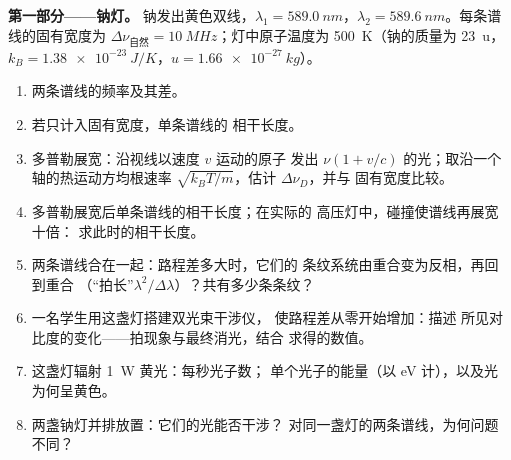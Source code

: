 \begin{problem}
\label{pb:b2:scalar-light-model:1}

\medskip
\noindent\textbf{第一部分——钠灯。}
钠发出黄色双线，$\lambda_1 = \qty{589.0}{nm}$，$\lambda_2 =
\qty{589.6}{nm}$。每条谱线的固有宽度为 $\Delta\nu_{\text{自然}} =
\qty{10}{MHz}$；灯中原子温度为 \qty{500}{K}（钠的质量为
\qty{23}{u}，$k_B = \qty{1.38e-23}{J/K}$，$u = \qty{1.66e-27}{kg}$）。
\begin{enumerate}
  \item 两条谱线的频率及其差。
  \item 若只计入固有宽度，单条谱线的
        相干长度。
  \item 多普勒展宽：沿视线以速度 $v$ 运动的原子
        发出 $\nu(1 + v/c)$ 的光；取沿一个轴的热运动方均根速率 $\sqrt{k_BT
        /m}$，估计 $\Delta\nu_D$，并与
        固有宽度比较。
  \item 多普勒展宽后单条谱线的相干长度；在实际的
        高压灯中，碰撞使谱线再展宽十倍：
        求此时的相干长度。
  \item 两条谱线合在一起：路程差多大时，它们的
        条纹系统由重合变为反相，再回到重合
        （“拍长”$\lambda^2/\Delta\lambda$）？共有多少条条纹？
  \item 一名学生用这盏灯搭建双光束干涉仪，
        使路程差从零开始增加：描述
        所见对比度的变化——拍现象与最终消光，结合
        求得的数值。
  \item 这盏灯辐射 \qty{1}{W} 黄光：每秒光子数；
        单个光子的能量（以 eV 计），以及光为何呈黄色。
  \item 两盏钠灯并排放置：它们的光能否干涉？
        对同一盏灯的两条谱线，为何问题不同？
\end{enumerate}


\end{problem}
